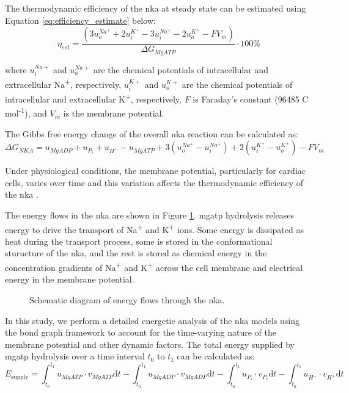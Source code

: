\documentclass{biophys-new}
\newcommand{\rev}[1]{{\color{black} #1}}
\begin{document}
The thermodynamic efficiency of the \gls{nka} at steady state can be estimated using Equation \ref{eq:efficiency_estimate} \cite{wagoner_mechanisms_2019} below:
\begin{equation}
      \label{eq:efficiency_estimate}
      \eta_{est} = \frac{\left(3u_o^{Na^+} + 2u_i^{K^+}-3u_i^{Na^+}-2u_o^{K^+}-FV_m\right)}{\Delta G_{MgATP}} \cdot 100\%
\end{equation}

where $u_i^{Na+}$ and $u_o^{Na+}$ are the chemical potentials of intracellular and extracellular Na\textsuperscript{+}, respectively,
$u_i^{K+}$ and $u_o^{K+}$ are the chemical potentials of intracellular and extracellular K\textsuperscript{+}, respectively,
$F$ is Faraday's constant (96485 C mol\textsuperscript{-1}), and $V_m$ is the membrane potential.

The Gibbs free energy change of the overall \gls{nka} reaction can be calculated as:
\begin{equation}
      \label{eq:deltaG_nka}
      \Delta G_{NKA} =  u_{MgADP} + u_{P_i} + u_{H^+} - u_{MgATP} + 3(u_o^{Na^+}-u_i^{Na^+}) + 2(u_i^{K^+}-u_o^{K^+}) - FV_m
\end{equation}

Under physiological conditions, the membrane potential, particularly for cardiac cells, varies over time and this variation affects the thermodynamic efficiency of the \gls{nka} \cite{wagoner_mechanisms_2019,peluffo_nak-atpase_2023}. 

The energy flows in the \gls{nka} are shown in Figure \ref{fig:NKA}. \gls{mgatp} hydrolysis releases energy to drive the transport of Na\textsuperscript{+} and K\textsuperscript{+} ions. Some energy is dissipated as heat \rev{during the transport process, some is stored in the conformational sturucture of the \gls{nka}}, and the rest is stored as chemical energy in the concentration gradients of Na\textsuperscript{+} and K\textsuperscript{+} across the cell membrane and electrical energy in the membrane potential.

\begin{figure}[htbp]
\centering

\caption{Schematic diagram of energy flows through the \gls{nka}.}
\label{fig:NKA}
\end{figure}

In this study, we perform a detailed energetic analysis of the \gls{nka} models using the bond graph framework to account for the time-varying nature of the membrane potential and other dynamic factors. The total energy supplied by \gls{mgatp} hydrolysis over a time interval $t_0$ to $t_1$ can be calculated as:
\begin{equation}
      \label{eq:energy_supply}
      E_\text{supply} = \int_{t_0}^{t_1} u_{MgATP} \cdot v_{MgATP} \mathrm{d}t- \int_{t_0}^{t_1} u_{MgADP} \cdot v_{MgADP} \mathrm{d}t - \int_{t_0}^{t_1} u_{P_i} \cdot v_{P_i} \mathrm{d}t - \int_{t_0}^{t_1} u_{H^+} \cdot v_{H^+} \mathrm{d}t
\end{equation}
\end{document}
